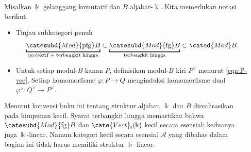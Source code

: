 \begin{convention}\label{con:Mod-pfg}
	Misalkan $\Bbbk$ gelanggang komutatif dan $B$ aljabar-$\Bbbk$. Kita
	memerlukan notasi berikut.
	\begin{itemize}
		\item Tinjau subkategori penuh
		\[ \underbracket{\catesubd{Mod}{\mathrm{pfg}}B}_{\text{projektif + terbangkit hingga}} \subset \underbracket{\catesubd{Mod}{\mathrm{fg}}B}_{\text{terbangkit hingga}} \subset \cated{Mod}B. \]
		\item Untuk setiap modul-$B$ kanan $P$, definisikan modul-$B$ kiri
		$P^\vee$ menurut \eqref{eqn:P-vee}. Setiap homomorfisme
		$\varphi:P\to Q$ menginduksi homomorfisme dual
		$\varphi^\vee:Q^\vee\to P^\vee$.
	\end{itemize}
	Menurut konvensi buku ini tentang struktur aljabar, $\Bbbk$ dan $B$
	direalisasikan pada himpunan kecil. Syarat terbangkit hingga memastikan
	bahwa $\catesubd{Mod}{\mathrm{fg}}B$ dan
	$\cate{Vect}_{\mathrm f}(\Bbbk)$ kecil secara esensial; keduanya juga
	$\Bbbk$-linear. Namun kategori kecil secara esensial $\mathcal{A}$ yang
	dibahas dalam bagian ini tidak harus memiliki struktur $\Bbbk$-linear.
\end{convention}

